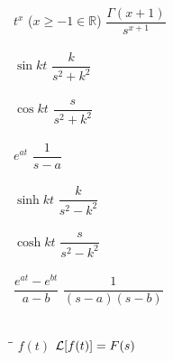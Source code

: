 \begin{multicols}{2}
\begin{center}
\begin{tabbing}
			$t^x$ ($x\geq-1\in\mathbb{R}$)     \> $\dfrac{\Gamma(x+1)}{s^{x+1}}$ \>\LTNUM\\ \\
			$\sin kt$ 	\> $\dfrac{k}{s^2+k^2}$ \>\LTNUM \\ \\
			$\cos kt$ 	\> $\dfrac{s}{s^2+k^2}$ \>\LTNUM \\ \\
			$e^{at}$ 	\> $\dfrac{1}{s-a}$ 	\>\LTNUM \\ \\
			$\sinh kt$	\> $\dfrac{k}{s^2-k^2}$ \>\LTNUM \\ \\
			$\cosh kt$	\> $\dfrac{s}{s^2-k^2}$ \>\LTNUM \\ \\
			$\dfrac{e^{at}-e^{bt}}{a-b}$	\> $\dfrac{1}{(s-a)(s-b)}$ \>\LTNUM\\ \\ 
		\end{tabbing}
	\end{center}
	
	\columnbreak
	
	\begin{center}
		\begin{tabbing}
			\hspace*{1.5in}\=\hspace{1.5in}\= \kill
			$f(t)$ \> $\mathcal{L}{\left[f(t)\right]}=F(s)$ \> \\ \\
			

\end{tabbing}
\end{center}
\end{multicols}
